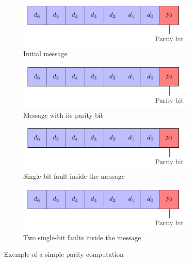 \begin{figure}[ht]
    \centering
    \begin{subfigure}[b]{0.49\textwidth}
        \includegraphics[width=\textwidth, page=2]{c5_countermeasures_dift/img/simple_parity.pdf}
        \caption{Initial message}
        \label{fig:simpleparity_example_1}
    \end{subfigure}
    \hfill
    \begin{subfigure}[b]{0.49\textwidth}
        \includegraphics[width=\textwidth, page=3]{c5_countermeasures_dift/img/simple_parity.pdf}
        \caption{Message with its parity bit}
        \label{fig:simpleparity_example_2}
    \end{subfigure}
    \hfill
    \begin{subfigure}[b]{0.49\textwidth}
        \includegraphics[width=\textwidth, page=4]{c5_countermeasures_dift/img/simple_parity.pdf}
        \caption{Single-bit fault inside the message}
        \label{fig:simpleparity_faulted_example_3}
    \end{subfigure}
    \hfill
    \begin{subfigure}[b]{0.49\textwidth}
        \includegraphics[width=\textwidth, page=5]{c5_countermeasures_dift/img/simple_parity.pdf}
        \caption{Two single-bit faults inside the message}
        \label{fig:simpleparity_faulted_example_4}
    \end{subfigure}
    \caption{Exemple of a simple parity computation}
    \label{fig:simpleparity_example}
\end{figure}

